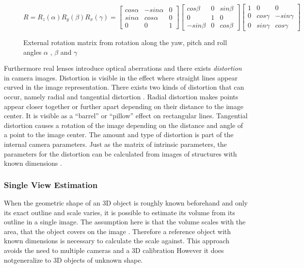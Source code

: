 \begin{figure}[h!]
\centering
\begin{equation*}
    R
    =
    R_z(\alpha)R_y(\beta)R_x(\gamma)
    =
    \begin{bmatrix}
    cos \alpha{} & - sin \alpha{} & 0 \\
    sin \alpha{} & cos \alpha{} & 0 \\
    0 & 0 & 1 
    \end{bmatrix}
    \begin{bmatrix}
    cos \beta{} & 0 & sin \beta{} \\
    0 & 1 & 0 \\
    - sin \beta{} & 0 & cos \beta{}
    \end{bmatrix}
    \begin{bmatrix}
    1 & 0 & 0 \\
    0 & cos \gamma{} & - sin \gamma{} \\
    0 & sin \gamma{} & cos \gamma{} 
    \end{bmatrix}
\end{equation*}
\caption{External rotation matrix from rotation along the yaw, pitch and roll angles $ \alpha{} $ , $ \beta{} $ and $ \gamma{} $ }
\label{eq:sota:rotation}
\end{figure}

Furthermore real lenses introduce optical aberrations and 
there exists \emph{distortion} in camera images.
Distortion is visible in the effect where straight lines appear curved in the image representation.
There exists two kinds of distortion that can occur, namely radial and tangential distortion \autocite[][Fig.~2]{weng1992distortion}.
Radial distortion makes points appear closer together or further apart depending on their distance to the image center. 
It is visible as a \enquote{barrel} or \enquote{pillow} effect on rectangular lines. 
Tangential distortion causes a rotation of the image depending on the distance and angle of a point to the image center.
The amount and type of distortion is part of the internal camera parameters.
Just as the matrix of intrinsic parameters, the parameters for the distortion can be calculated from images of structures with known dimensions
\autocite{opencv2018calibration}.

\subsubsection{Single View Estimation}
When the geometric shape of an \ac{3D} object is roughly known beforehand and only its exact outline and scale varies, it is possible to estimate its volume from its outline in a single image.
The assumption here is that the volume scales with the area, that the object covers on the image \autocite{levine1989microwave} \autocite[][]{wang2017apple} \autocite[][]{sapkal2017volume} .
Therefore a reference object with known dimensions is necessary to calculate the scale against.
This approach avoids the need to multiple cameras and a \ac{3D} calibration
However it does notgeneralize to \ac{3D} objects of unknown shape.

